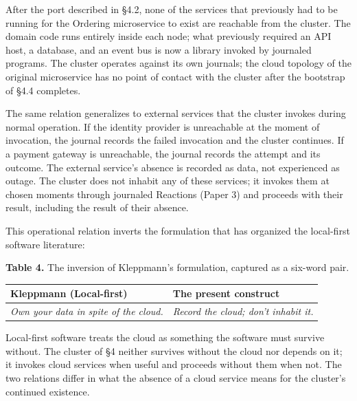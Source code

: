 \documentclass[
]{article}
\newcounter{none} %
\begin{document}
After the port described in §4.2, none of the services that previously
had to be running for the Ordering microservice to exist are reachable
from the cluster. The domain code runs entirely inside each node; what
previously required an API host, a database, and an event bus is now a
library invoked by journaled programs. The cluster operates against its
own journals; the cloud topology of the original microservice has no
point of contact with the cluster after the bootstrap of §4.4 completes.

The same relation generalizes to external services that the cluster
invokes during normal operation. If the identity provider is unreachable
at the moment of invocation, the journal records the failed invocation
and the cluster continues. If a payment gateway is unreachable, the
journal records the attempt and its outcome. The external service's
absence is recorded as data, not experienced as outage. The cluster does
not inhabit any of these services; it invokes them at chosen moments
through journaled Reactions (Paper 3) and proceeds with their result,
including the result of their absence.

This operational relation inverts the formulation that has organized the
local-first software literature:

\textbf{Table 4.} The inversion of Kleppmann's formulation, captured as
a six-word pair.

{\def\LTcaptype{none} %
\begin{longtable}[]{@{}
  >{\raggedright\arraybackslash}p{}
  >{\raggedright\arraybackslash}p{}@{}}
\toprule\noalign{}
\begin{minipage}[b]{\linewidth}\raggedright
Kleppmann (Local-first)
\end{minipage} & \begin{minipage}[b]{\linewidth}\raggedright
The present construct
\end{minipage} \\
\midrule\noalign{}
\endhead
\bottomrule\noalign{}
\endlastfoot
\emph{Own your data in spite of the cloud.} & \emph{Record the cloud;
don't inhabit it.} \\
\end{longtable}
}

Local-first software treats the cloud as something the software must
survive without. The cluster of §4 neither survives without the cloud
nor depends on it; it invokes cloud services when useful and proceeds
without them when not. The two relations differ in what the absence of a
cloud service means for the cluster's continued existence.
\end{document}

